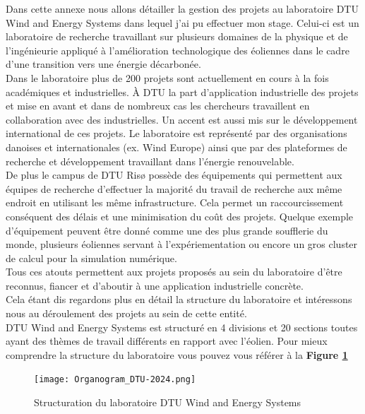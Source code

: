 \documentclass[12pt]{article}
\theoremstyle{plain}
\theoremstyle{remark}
\begin{document}
Dans cette annexe nous allons détailler la gestion des projets au laboratoire DTU Wind and Energy Systems dans lequel j'ai pu effectuer mon stage. Celui-ci est un laboratoire de recherche travaillant sur plusieurs domaines de la physique et de l'ingénieurie appliqué à l'amélioration technologique des éoliennes dans le cadre d'une transition vers une énergie décarbonée. \\

Dans le laboratoire plus de 200 projets sont actuellement en cours à la fois académiques et industrielles. À DTU la part d'application industrielle des projets et mise en avant et dans de nombreux cas les chercheurs travaillent en collaboration avec des industrielles. Un accent est aussi mis sur le développement international de ces projets. Le laboratoire est représenté par des organisations danoises et internationales (ex. Wind Europe) ainsi que par des plateformes de recherche et développement travaillant dans l'énergie renouvelable. \\
De plus le campus de DTU Risø possède des équipements qui permettent aux équipes de recherche d'effectuer la majorité du travail de recherche aux même endroit en utilisant les même infrastructure. Cela permet un raccourcissement conséquent des délais et une minimisation du coût des projets. Quelque exemple d'équipement peuvent être donné comme une des plus grande soufflerie du monde, plusieurs éoliennes servant à l'expériementation ou encore un gros cluster de calcul pour la simulation numérique.\\ Tous ces atouts permettent aux projets proposés au sein du laboratoire d'être reconnus, fiancer et d'aboutir à une application industrielle concrète. \\

Cela étant dis regardons plus en détail la structure du laboratoire et intéressons nous au déroulement des projets au sein de cette entité. \\
DTU Wind and Energy Systems est structuré en 4 divisions et 20 sections toutes ayant des thèmes de travail différents en rapport avec l'éolien. Pour mieux comprendre la structure du laboratoire vous pouvez vous référer à la \textbf{Figure \ref{fig:organigrame}}

\begin{figure}[H]
	\begin{center}
		\texttt{[image: Organogram\_DTU-2024.png]}
		\caption{Structuration du laboratoire DTU Wind and Energy Systems}
		\label{fig:organigrame}
	\end{center}
\end{figure}
\end{document}
